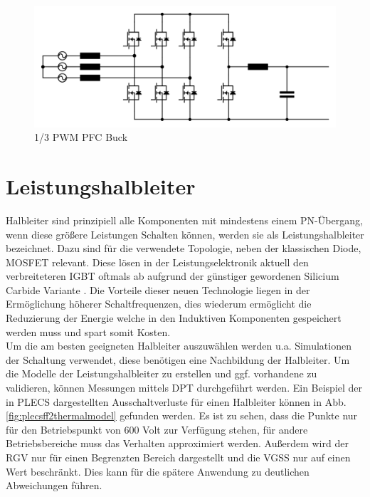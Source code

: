 \begin{figure}[H]
	\centering
	\includegraphics[width=0.9\linewidth]{content/Grafiken/B6_Buck}
	\caption[1/3 PWM PFC Buck]{1/3 PWM PFC Buck}
	\label{fig:b6buck}
\end{figure}


\section{Leistungshalbleiter}
Halbleiter sind prinzipiell alle Komponenten mit mindestens einem PN-Übergang, wenn diese größere Leistungen Schalten können, werden sie als Leistungshalbleiter bezeichnet. Dazu sind für die verwendete Topologie, neben der klassischen Diode, \gls{MOSFET}  relevant. Diese lösen in der Leistungselektronik aktuell den verbreiteteren IGBT oftmals ab aufgrund der günstiger gewordenen Silicium Carbide Variante \cite{SiCTrend}. Die Vorteile dieser neuen Technologie liegen in der Ermöglichung höherer Schaltfrequenzen, dies wiederum ermöglicht die Reduzierung der Energie welche in den Induktiven Komponenten gespeichert werden muss und spart somit Kosten.\\
Um die am besten geeigneten Halbleiter auszuwählen werden u.a. Simulationen der Schaltung verwendet, diese benötigen eine Nachbildung der Halbleiter. Um die Modelle der Leistungshalbleiter zu erstellen und ggf. vorhandene zu validieren, können Messungen mittels \gls{DPT} durchgeführt werden. Ein Beispiel der in \gls{PLECS} dargestellten Ausschaltverluste für einen Halbleiter können in Abb. \ref{fig:plecsff2thermalmodel} gefunden werden. Es ist zu sehen, dass die Punkte nur für den Betriebspunkt von 600 Volt zur Verfügung stehen, für andere Betriebsbereiche muss das Verhalten approximiert werden. Außerdem wird der \gls{RGV} nur für einen Begrenzten Bereich dargestellt und die \gls{VGSS} nur auf einen Wert beschränkt. Dies kann für die spätere Anwendung zu deutlichen Abweichungen führen.
